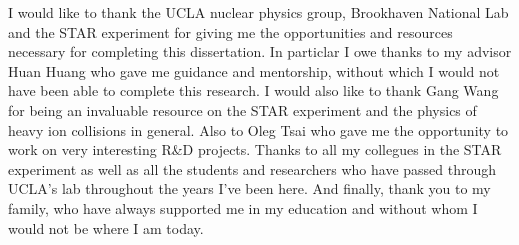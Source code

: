 I would like to thank the UCLA nuclear physics group, Brookhaven National Lab and the STAR experiment for giving me the opportunities and resources necessary for completing this dissertation. In particlar I owe thanks to my advisor Huan Huang who gave me guidance and mentorship, without which I would not have been able to complete this research. I would also like to thank Gang Wang for being an invaluable resource on the STAR experiment and the physics of heavy ion collisions in general. Also to Oleg Tsai who gave me the opportunity to work on very interesting R\&D projects. Thanks to all my collegues in the STAR experiment as well as all the students and researchers who have passed through UCLA's lab throughout the years I've been here. And finally, thank you to my family, who have always supported me in my education and without whom I would not be where I am today.    
